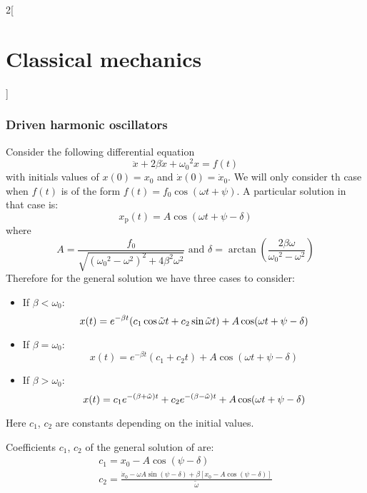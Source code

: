 \documentclass[../../../main_physics.tex]{subfiles}
\begin{document}
\begin{multicols}{2}[\section{Classical mechanics}]
  \subsubsection{Driven harmonic oscillators}
  \begin{proposition}
    Consider the following differential equation $$\ddot{x}+2\beta\dot{x}+{\omega_0}^2 x=f(t)$$ with initials values of $x(0)=x_0$ and $\dot{x}(0)=\dot{x}_0$. We will only consider th case when $f(t)$ is of the form $f(t)=f_0\cos(\omega t+\psi)$. A particular solution in that case is:
    $$x_\text{p}(t)=A\cos(\omega t+\psi-\delta)$$
    where $$A=\frac{f_0}{\sqrt{{({\omega_0}^2-\omega^2)}^2+4\beta^2\omega^2}}\text{ and }\delta=\arctan\left({\frac{2\beta\omega}{{\omega_0}^2-\omega^2}}\right)$$ Therefore for the general solution we have three cases to consider:
    \begin{itemize}
      \item If $\beta<\omega_0$:
            \begin{equation}
              x(t)=e^{-\beta t}(c_1\cos\Tilde{\omega}t+c_2\sin\Tilde{\omega}t)+A\cos(\omega t+\psi-\delta)
              \label{CM_d-b<w}
            \end{equation}
      \item If $\beta=\omega_0$:
            \begin{equation}
              x(t)=e^{-\beta t}\left(c_1+c_2t\right)+A\cos(\omega t+\psi-\delta)
              \label{CM_d-b=w}
            \end{equation}
      \item If $\beta>\omega_0$:
            \begin{equation}
              x(t)=c_1e^{-(\beta+\Tilde{\omega})t}+c_2e^{-(\beta-\Tilde{\omega})t}+A\cos(\omega t+\psi-\delta)
              \label{CM_d-b>w}
            \end{equation}
    \end{itemize}
    Here $c_1$, $c_2$ are constants depending on the initial values.
  \end{proposition}
  \begin{proposition}
    Coefficients $c_1$, $c_2$ of the general solution of  are:
    \begin{gather*}
      c_1=x_0-A\cos\left(\psi-\delta\right)\\
      c_2=\frac{\dot{x}_0-\omega A\sin\left(\psi-\delta\right)+\beta\left[x_0-A\cos\left(\psi-\delta\right)\right]}{\tilde{\omega}}
    \end{gather*}

\end{proposition}
\end{multicols}
\end{document}
